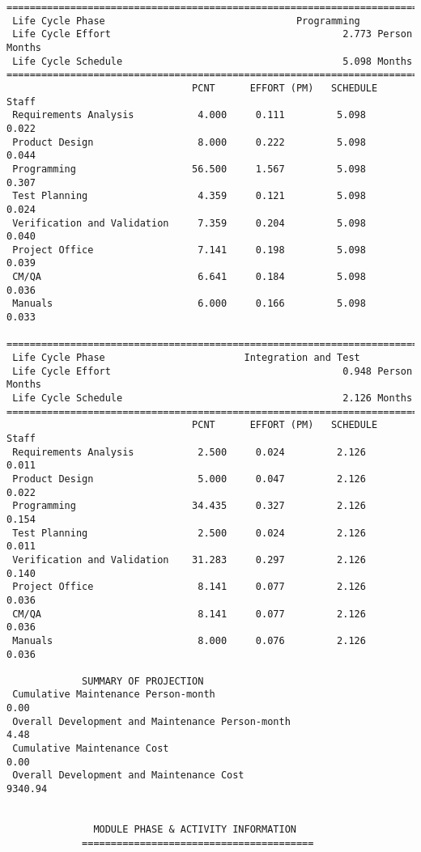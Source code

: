 \documentclass[11pt,a4paper,spanish,twoside]{report}
\begin{document}
{\begin{verbatim}
==============================================================================
 Life Cycle Phase                                 Programming
 Life Cycle Effort                                        2.773 Person Months
 Life Cycle Schedule                                      5.098 Months
==============================================================================
                                PCNT      EFFORT (PM)   SCHEDULE       Staff   
 Requirements Analysis           4.000     0.111         5.098        0.022
 Product Design                  8.000     0.222         5.098        0.044
 Programming                    56.500     1.567         5.098        0.307
 Test Planning                   4.359     0.121         5.098        0.024
 Verification and Validation     7.359     0.204         5.098        0.040
 Project Office                  7.141     0.198         5.098        0.039
 CM/QA                           6.641     0.184         5.098        0.036
 Manuals                         6.000     0.166         5.098        0.033

==============================================================================
 Life Cycle Phase                        Integration and Test
 Life Cycle Effort                                        0.948 Person Months
 Life Cycle Schedule                                      2.126 Months
==============================================================================
                                PCNT      EFFORT (PM)   SCHEDULE       Staff   
 Requirements Analysis           2.500     0.024         2.126        0.011
 Product Design                  5.000     0.047         2.126        0.022
 Programming                    34.435     0.327         2.126        0.154
 Test Planning                   2.500     0.024         2.126        0.011
 Verification and Validation    31.283     0.297         2.126        0.140
 Project Office                  8.141     0.077         2.126        0.036
 CM/QA                           8.141     0.077         2.126        0.036
 Manuals                         8.000     0.076         2.126        0.036

             SUMMARY OF PROJECTION
 Cumulative Maintenance Person-month                                 0.00
 Overall Development and Maintenance Person-month                    4.48
 Cumulative Maintenance Cost                                         0.00
 Overall Development and Maintenance Cost                         9340.94


		       MODULE PHASE & ACTIVITY INFORMATION
		     ========================================


\end{verbatim}}
\end{document}
